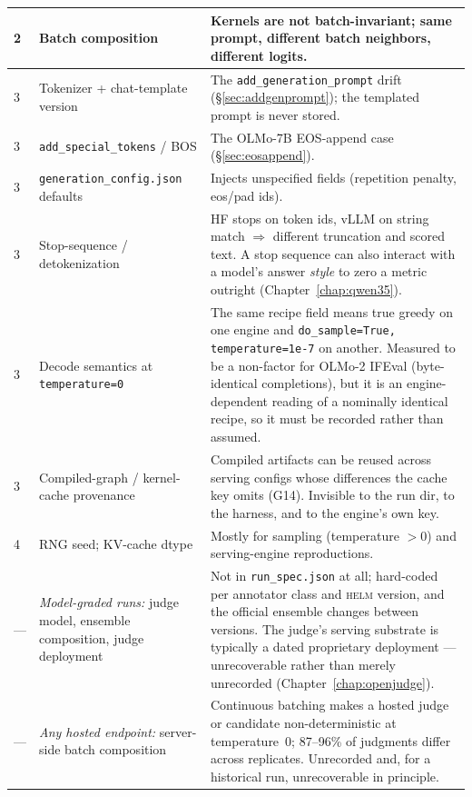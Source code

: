 \documentclass[11pt]{report}
\newcommand{\code}[1]{\texttt{#1}}
\newcommand{\file}[1]{\texttt{#1}}
\begin{document}
\begin{longtable}{@{}p{}p{}p{}@{}}
2 & Batch composition & Kernels are not batch-invariant; same prompt, different
    batch neighbors, different logits. \\
\midrule
3 & Tokenizer + chat-template version & The \code{add\_generation\_prompt} drift
    (\S\ref{sec:addgenprompt}); the templated prompt is never stored. \\
3 & \code{add\_special\_tokens} / BOS & The OLMo-7B EOS-append case
    (\S\ref{sec:eosappend}). \\
3 & \code{generation\_config.json} defaults & Injects unspecified fields
    (repetition penalty, eos/pad ids). \\
3 & Stop-sequence / detokenization & HF stops on token ids, vLLM on string match
    $\Rightarrow$ different truncation and scored text. A stop sequence can also
    interact with a model's answer \emph{style} to zero a metric outright
    (Chapter~\ref{chap:qwen35}). \\
3 & Decode semantics at \code{temperature=0} & The same recipe field means true
    greedy on one engine and \code{do\_sample=True, temperature=1e-7} on another.
    Measured to be a non-factor for OLMo-2 IFEval (byte-identical completions), but
    it is an engine-dependent reading of a nominally identical recipe, so it must be
    recorded rather than assumed. \\
3 & Compiled-graph / kernel-cache provenance & Compiled artifacts can be reused
    across serving configs whose differences the cache key omits (G14). Invisible to
    the run dir, to the harness, and to the engine's own key. \\
\midrule
4 & RNG seed; KV-cache dtype & Mostly for sampling (temperature $>0$) and
    serving-engine reproductions. \\
\midrule
--- & \emph{Model-graded runs:} judge model, ensemble composition, judge deployment &
    Not in \file{run\_spec.json} at all; hard-coded per annotator class and
    \textsc{helm} version, and the official ensemble changes between versions. The
    judge's serving substrate is typically a dated proprietary deployment ---
    unrecoverable rather than merely unrecorded (Chapter~\ref{chap:openjudge}). \\
--- & \emph{Any hosted endpoint:} server-side batch composition & Continuous
    batching makes a hosted judge or candidate non-deterministic at temperature~0;
    87--96\% of judgments differ across replicates. Unrecorded and, for a historical
    run, unrecoverable in principle. \\
\bottomrule
\end{longtable}
\end{document}
